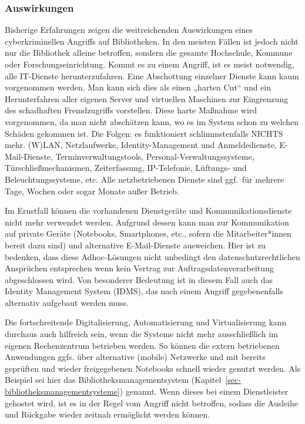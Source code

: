 \documentclass[
  11pt,
  letterpaper,
  DIV=11,
  twoside]{scrreprt}
\begin{document}
\subsubsection{Auswirkungen}\label{auswirkungen}

Bisherige Erfahrungen zeigen die weitreichenden Auswirkungen eines
cyberkriminellen Angriffs auf Bibliotheken. In den meisten Fällen ist
jedoch nicht nur die Bibliothek alleine betroffen, sondern die gesamte
Hochschule, Kommune oder Forschungseinrichtung. Kommt es zu einem
Angriff, ist es meist notwendig, alle IT-Dienste herunterzufahren. Eine
Abschottung einzelner Dienste kann kaum vorgenommen werden. Man kann
sich dies als einen „harten Cut`` und ein Herunterfahren aller eigenen
Server und virtuellen Maschinen zur Eingrenzung des schadhaften
Fremdzugriffs vorstellen. Diese harte Maßnahme wird vorgenommen, da man
nicht abschätzen kann, wo es im System schon zu welchen Schäden gekommen
ist. Die Folgen: es funktioniert schlimmstenfalls NICHTS mehr. (W)LAN,
Netzlaufwerke, Identity-Management und Anmeldedienste, E-Mail-Dienste,
Terminverwaltungstools, Personal-Verwaltungssysteme,
Türschließmechanismen, Zeiterfassung, IP-Telefonie, Lüftungs- und
Beleuchtungssysteme, etc. Alle netzbetriebenen Dienste sind ggf.~für
mehrere Tage, Wochen oder sogar Monate außer Betrieb.

Im Ernstfall können die vorhandenen Dienstgeräte und
Kommunikationsdienste nicht mehr verwendet werden. Aufgrund dessen kann
man zur Kommunikation auf private Geräte (Notebooks, Smartphones, etc.,
sofern die Mitarbeiter*innen bereit dazu sind) und alternative
E-Mail-Dienste ausweichen. Hier ist zu bedenken, dass diese
Adhoc-Lösungen nicht unbedingt den datenschutzrechtlichen Ansprüchen
entsprechen wenn kein Vertrag zur Auftragsdatenverarbeitung
abgeschlossen wird. Von besonderer Bedeutung ist in diesem Fall auch das
Identity Management System (IDMS), das nach einem Angriff gegebenenfalls
alternativ aufgebaut werden muss.

Die fortschreitende Digitalisierung, Automatisierung und Virtualisierung
kann durchaus auch hilfreich sein, wenn die Systeme nicht mehr
ausschließlich im eigenen Rechenzentrum betrieben werden. So können die
extern betriebenen Anwendungen ggfs. über alternative (mobile) Netzwerke
und mit bereits geprüften und wieder freigegebenen Notebooks schnell
wieder genutzt werden. Als Beispiel sei hier das
Bibliotheksmanagementsystem
(Kapitel~\ref{sec-bibliotheksmanagementsysteme}) genannt. Wenn dieses
bei einem Dienstleister gehostet wird, ist es in der Regel vom Angriff
nicht betroffen, sodass die Ausleihe und Rückgabe wieder zeitnah
ermöglicht werden können.
\end{document}

